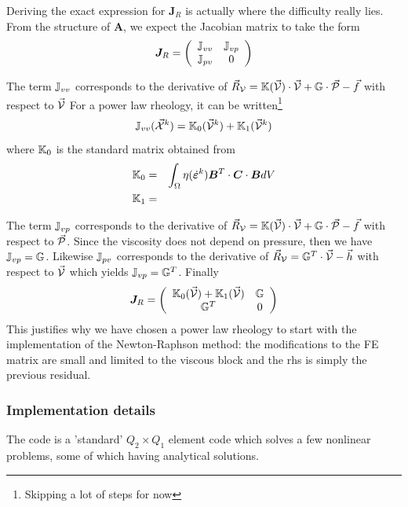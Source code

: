 \begin{itemize}
Deriving the exact expression for ${\bm J}_R$ is actually where the difficulty really lies.
From the structure of ${\bm A}$, we expect the Jacobian matrix to take the form
\[
{\bm J}_R = 
\left(
\begin{array}{cc}
{\mathbb{J}}_{vv} & {\mathbb{J}}_{vp}  \\
{\mathbb{J}}_{pv} & 0 
\end{array}
\right)
\] 

The term ${\mathbb{J}}_{vv}$ corresponds to the derivative of
$\vec{R}_{\cal V}= {\mathbb{K}}(\vec{\cal V}) \cdot \vec{\cal V} + {\mathbb{G}} \cdot \vec{\cal P} - \vec{f}$
with respect to $\vec{\cal V}$
For a power law rheology, it can be written\footnote{Skipping a lot of steps for now}
\[
{\mathbb{J}}_{vv}(\vec{\cal X}^k) = {\mathbb{K}}_0(\vec{\cal V}^k)+{\mathbb{K}}_1(\vec{\cal V}^k)
\]
where ${\mathbb{K}}_0$ is the standard matrix obtained from 
\begin{eqnarray}
{\mathbb{K}}_0 &=& \int_\Omega \eta(\dot{\bm \varepsilon}^k) {\bm B}^T \cdot {\bm C} \cdot  {\bm B} dV \\
{\mathbb{K}}_1 &=& 
\end{eqnarray}


The term ${\mathbb{J}}_{vp}$ corresponds to the derivative of 
$\vec{R}_{\cal V}= {\mathbb{K}}(\vec{\cal V}) \cdot \vec{\cal V} + {\mathbb{G}} \cdot \vec{\cal P} - \vec{f}$ 
with respect to $\vec{\cal P}$. Since the viscosity does not depend on pressure, 
then we have ${\mathbb{J}}_{vp}={\mathbb{G}}$.
Likewise ${\mathbb{J}}_{pv}$ corresponds to the derivative of
$\vec{R}_{\cal V}= {\mathbb{G}}^T \cdot \vec{\cal V} -\vec{h}$  with respect to $\vec{\cal V}$
which yields ${\mathbb{J}}_{vp}={\mathbb{G}}^T$.
Finally 
\[
{\bm J}_R = 
\left(
\begin{array}{cc}
{\mathbb{K}}_0(\vec{\cal V}) + {\mathbb{K}}_1(\vec{\cal V}) & {\mathbb{G}}  \\
{\mathbb{G}}^T & 0 
\end{array}
\right)
\] 
This justifies why we have chosen a power law rheology to start with the implementation of 
the Newton-Raphson method: the modifications to the FE matrix are small and limited 
to the viscous block and the rhs is simply the previous residual. 
 
\end{itemize}


\subsubsection*{Implementation details}

The code is a 'standard' $Q_2 \times Q_1$ element code which solves 
a few nonlinear problems, some of which having analytical solutions. 

